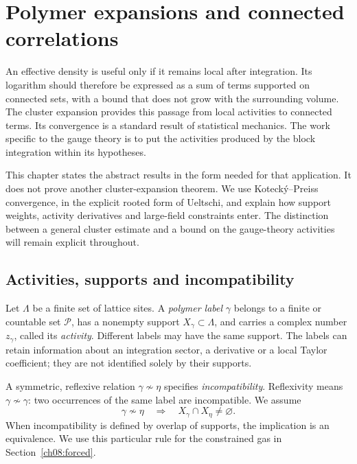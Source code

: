 \chapter{Polymer expansions and connected correlations}
\label{ch08:chapter}

An effective density is useful only if it remains local after integration.
Its logarithm should therefore be expressed as a sum of terms supported on
connected sets, with a bound that does not grow with the surrounding volume.
The cluster expansion provides this passage from local activities to connected
terms. Its convergence is a standard result of statistical mechanics. The
work specific to the gauge theory is to put the activities produced by the
block integration within its hypotheses.

This chapter states the abstract results in the form needed for that
application. It does not prove another cluster-expansion theorem. We use
Koteck\'y--Preiss convergence\cite{KoteckyPreiss1986}, in the explicit rooted
form of Ueltschi\cite[Theorem~1]{Ueltschi2004}, and explain how support weights,
activity derivatives and large-field constraints enter. The distinction
between a general cluster estimate and a bound on the gauge-theory
activities will remain explicit throughout.

\section{Activities, supports and incompatibility}
\label{ch08:activities}

Let $\Lambda$ be a finite set of lattice sites. A \emph{polymer label}
$\gamma$ belongs to a finite or countable set $\mathcal P$, has a nonempty
support $X_\gamma\subset\Lambda$, and carries a complex number
$z_\gamma$, called its \emph{activity}. Different labels may have the same
support. The labels can retain information about an integration sector, a
derivative or a local Taylor coefficient; they are not identified solely by
their supports.

A symmetric, reflexive relation $\gamma\not\sim\eta$ specifies
\emph{incompatibility}. Reflexivity means $\gamma\not\sim\gamma$: two occurrences of the same
label are incompatible. We assume
\begin{equation}\label{ch08:overlap}
 \gamma\not\sim\eta\quad\Longrightarrow\quad
 X_\gamma\cap X_\eta\ne\varnothing.
\end{equation}
When incompatibility is defined by overlap of supports, the implication
is an equivalence. We use this particular rule for the constrained gas
in Section~\ref{ch08:forced}.

